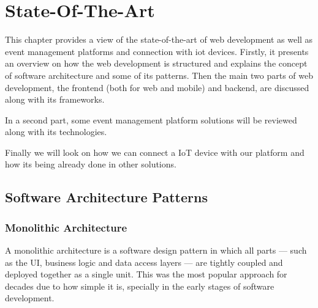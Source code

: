 
%

\chapter{State-Of-The-Art}
\label{cha:State-Of-The-Art}

This chapter provides a view of the state-of-the-art of web development as well
as event management platforms and connection with iot devices.
Firstly, it presents an overview on how the web development is structured and
explains the concept of software architecture and some of its patterns. Then the
main two parts of web development, the frontend (both for web and mobile) and
backend, are discussed along with its frameworks.

In a second part, some event management platform solutions will be reviewed
along with its technologies.

Finally we will look on how we can connect a IoT device with our platform and
how its being already done in other solutions.

\section{Software Architecture Patterns}

\subsection{Monolithic Architecture}
A monolithic architecture is a software design pattern in which all parts ---
such as the \gls{UI}, business logic and data access layers --- are tightly
coupled and deployed together as a single unit\cite{7436659,10031648}. This
was the most popular approach for decades due to how simple it is, specially in
the early stages of software development\cite{Garlan2018}.

